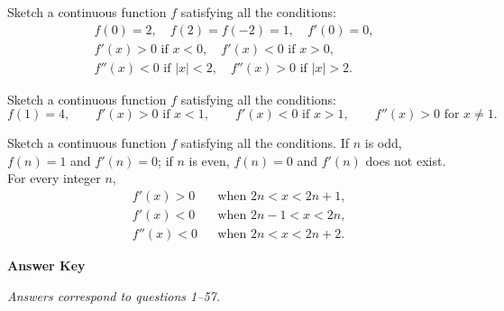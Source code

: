\documentclass[11pt]{article}
\newcommand{\wsL}{\vspace*{5.0cm}}
\newcommand{\prob}[1]{\item[\textbf{#1}]}
\begin{document}
\Needspace{10cm}
\begin{probs}
\prob{55.} Sketch a continuous function $f$ satisfying all the conditions: \[\begin{gathered} f(0)=2,\quad f(2)=f(-2)=1,\quad f'(0)=0,\\ f'(x)>0\text{ if }x<0,\quad f'(x)<0\text{ if }x>0,\\ f''(x)<0\text{ if }|x|<2,\quad f''(x)>0\text{ if }|x|>2. \end{gathered}\] \wsL
\end{probs}
\Needspace{10cm}
\begin{probs}
\prob{56.} Sketch a continuous function $f$ satisfying all the conditions: \[f(1)=4,\qquad f'(x)>0\text{ if }x<1,\qquad f'(x)<0\text{ if }x>1,\qquad f''(x)>0\text{ for }x\ne1.\] \wsL
\end{probs}
\Needspace{10cm}
\begin{probs}
\prob{57.} Sketch a continuous function $f$ satisfying all the conditions. If $n$ is odd, $f(n)=1$ and $f'(n)=0$; if $n$ is even, $f(n)=0$ and $f'(n)$ does not exist. For every integer $n$, \[\begin{aligned} &f'(x)>0 &&\text{when }2n<x<2n+1,\\ &f'(x)<0 &&\text{when }2n-1<x<2n,\\ &f''(x)<0 &&\text{when }2n<x<2n+2. \end{aligned}\] \wsL
\end{probs}
\clearpage
\begin{center}{\LARGE\bfseries Answer Key}\end{center}
\medskip
\noindent\textit{Answers correspond to questions 1--57.}
\end{document}

